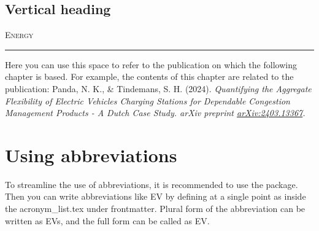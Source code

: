 \subsection{Vertical heading}
\begin{minipage}[b]{0.075\linewidth} 
\end{minipage}%
\begin{minipage}[b]{0.9\linewidth} %
\lettrine{\color{royal_blue}E}{nergy} \lipsum[8]
\end{minipage}

 

 \vfill
\rule{\textwidth}{0.4pt}
Here you can use this space to refer to the publication on which the following chapter is based. For example, the contents of this chapter are related to the publication: Panda, N. K., \& Tindemans, S. H. (2024). \textit{Quantifying the Aggregate Flexibility of Electric Vehicles Charging Stations for Dependable Congestion Management Products - A Dutch Case Study. \textit{arXiv preprint} \href{https://arxiv.org/abs/2403.13367}{arXiv:2403.13367}.}
\newpage
\section{Using abbreviations}
To streamline the use of abbreviations, it is recommended to use the  package. Then you can write abbreviations like \ac{EV} by defining at a single point as inside the acronym\_list.tex under frontmatter. Plural form of the abbreviation can be written as \acp{EV}, and the full form can be called as \acf{EV}.
